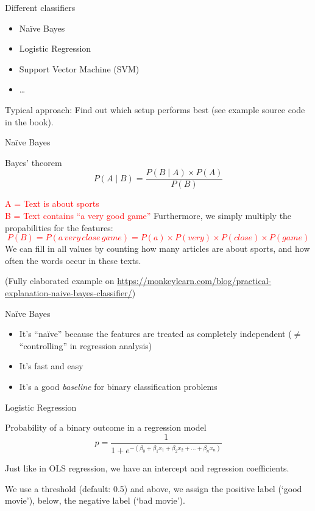 \documentclass{beamer}
\begin{document}
\begin{frame}{Different classifiers}
	\begin{itemize}
		\item Naïve Bayes
		\item Logistic Regression
		\item Support Vector Machine (SVM)
		\item \ldots
	\end{itemize}
Typical approach: Find out which setup performs best (see example source code in the book).
\end{frame}



\begin{frame}{Naïve Bayes}
\begin{block}{Bayes' theorem}
$$ P(A \mid B) = \frac{P(B \mid A) \times P(A)}{P(B)} $$
\end{block}

\pause
\textcolor{red}{A = Text is about sports\\
B = Text contains ``a very good game''}
\pause
Furthermore, we simply multiply the propabilities for the features:
\textcolor{red}{$$P(B) = P(a\, very\, close\, game) = P(a) \times P(very) \times P(close) \times P(game)$$}
We can fill in all values by counting how many articles are about sports, and how often the words occur in these texts.
\vspace{0.3cm}

\footnotesize{
(Fully elaborated example on \url{https://monkeylearn.com/blog/practical-explanation-naive-bayes-classifier/})}

\end{frame}


\begin{frame}{Naïve Bayes}
\begin{itemize}[<+->]
	\item It's ``naïve'' because the features are treated as completely independent ($\neq$ ``controlling'' in regression analysis)
	\item It's fast and easy
	\item It's a good \emph{baseline} for binary classification problems
\end{itemize}
\end{frame}


\begin{frame}{Logistic Regression}
\begin{block}{Probability of a binary outcome in a regression model}
$$p = \frac{1}{1 + e^{-(\beta_0 + \beta_1 x_1 + \beta_2 x_2 + \ldots + \beta_n x_n)}}$$
\end{block}
Just like in OLS regression, we have an intercept and regression coefficients. 

We use a threshold (default: 0.5) and above, we assign the positive label (`good movie'), below, the negative label (`bad movie').

\end{frame}
\end{document}
